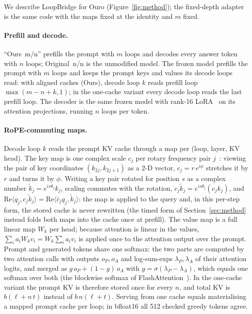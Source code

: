 \documentclass[11pt]{article}
\newcommand{\rw}[2]{Ours~#1/#2}
\newcommand{\nat}[1]{Original~#1/#1}
\begin{document}
We describe LoopBridge for Ouro (Figure~\ref{fig:method}); the fixed-depth adapter is the same code with the maps fixed at the identity and $m$ fixed.


\paragraph{Prefill and decode.} ``\rw{m}{n}'' prefills the prompt with $m$ loops and decodes every answer token with
$n$ loops; \nat{n} is the unmodified model. The frozen model prefills the prompt with $m$ loops and keeps the prompt
keys and values its decode loops read: with aligned caches (Ours), decode loop $k$ reads prefill loop $\max(m-n+k,1)$;
in the one-cache variant every decode loop reads the last prefill loop. The decoder is the same frozen model with rank-16 LoRA~\citep{lora} on its attention
projections, running $n$ loops per token.

\paragraph{RoPE-commuting maps.} Decode loop $k$ reads the prompt KV cache through a map per (loop, layer, KV head). The
key map is one complex scale $c_j$ per rotary frequency pair $j$~\citep{rope}: viewing the pair of key coordinates
$(k_{2j},k_{2j+1})$ as a 2-D vector, $c_j=r\,e^{i\phi}$ stretches it by $r$ and turns it by $\phi$. Writing a key pair rotated for position $s$ as a complex
number $\tilde k_j = e^{is\theta_j}k_j$, scaling commutes with the rotation, $c_j\tilde k_j = e^{is\theta_j}(c_jk_j)$,
and $\mathrm{Re}\langle q_j, c_j\tilde k_j\rangle = \mathrm{Re}\langle \bar c_jq_j, \tilde k_j\rangle$: the map is applied
to the query and, in this per-step form, the stored cache is never rewritten (the timed form of
Section~\ref{sec:method} instead folds both maps into the cache once at prefill). The value map is a full linear map $W_k$ per head; because
attention is linear in the values, $\sum_i a_iW_kv_i = W_k\sum_i a_iv_i$ is applied once to the attention output over the
prompt. Prompt and generated tokens share one softmax: the two parts are computed by two attention calls with outputs
$o_P, o_A$ and log-sum-exps $\lambda_P, \lambda_A$ of their attention logits, and merged as $g\,o_P+(1-g)\,o_A$ with
$g=\sigma(\lambda_P-\lambda_A)$, which equals one softmax over both (the blockwise softmax of FlashAttention~\citep{flashattn2}). In the one-cache variant the prompt KV is therefore stored once for every $n$, and total KV is $b(\ell+n\,t)$
instead of $b\,n(\ell+t)$. Serving from one cache equals materialising a mapped prompt cache per loop; in bfloat16 all 512
checked greedy tokens agree.
\end{document}
